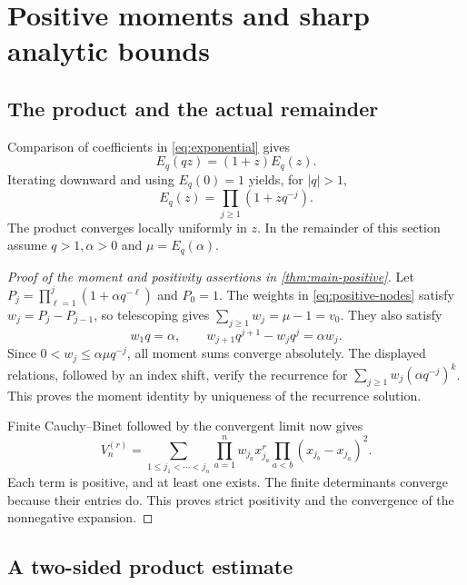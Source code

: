 \documentclass[11pt]{article}
\numberwithin{equation}{section}
\theoremstyle{definition}
\theoremstyle{remark}
\begin{document}
\section{Positive moments and sharp analytic bounds}\label{sec:positive}

\subsection{The product and the actual remainder}

Comparison of coefficients in \eqref{eq:exponential} gives
\begin{equation}\label{eq:functional}
 E_q(qz)=(1+z)E_q(z).
\end{equation}
Iterating downward and using $E_q(0)=1$ yields, for $|q|>1$,
\begin{equation}\label{eq:product}
 E_q(z)=\prod_{j\ge1}(1+zq^{-j}).
\end{equation}
The product converges locally uniformly in $z$. In the remainder of this
section assume $q>1,\alpha>0$ and $\mu=E_q(\alpha)$.

\begin{proof}[Proof of the moment and positivity assertions in
\cref{thm:main-positive}]
Let $P_j=\prod_{\ell=1}^j(1+\alpha q^{-\ell})$ and $P_0=1$.
The weights in \eqref{eq:positive-nodes} satisfy $w_j=P_j-P_{j-1}$,
so telescoping gives $\sum_{j\ge1}w_j=\mu-1=v_0$.
They also satisfy
\[
 w_1q=\alpha,\qquad w_{j+1}q^{j+1}-w_jq^j=\alpha w_j.
\]
Since $0<w_j\le\alpha\mu q^{-j}$, all moment sums converge absolutely.
The displayed relations, followed by an index shift, verify the recurrence
for $\sum_{j\ge1}w_j(\alpha q^{-j})^k$.
This proves the moment identity by uniqueness of the recurrence solution.

Finite Cauchy--Binet followed by the convergent limit now gives
\begin{equation}\label{eq:positive-CB}
 V_n^{(r)}=
 \sum_{1\le j_1<\cdots<j_n}
 \prod_{a=1}^n w_{j_a}x_{j_a}^r
 \prod_{a<b}(x_{j_b}-x_{j_a})^2.
\end{equation}
Each term is positive, and at least one exists. The finite determinants
converge because their entries do. This proves strict positivity and the
convergence of the nonnegative expansion.
\end{proof}

\subsection{A two-sided product estimate}
\end{document}
